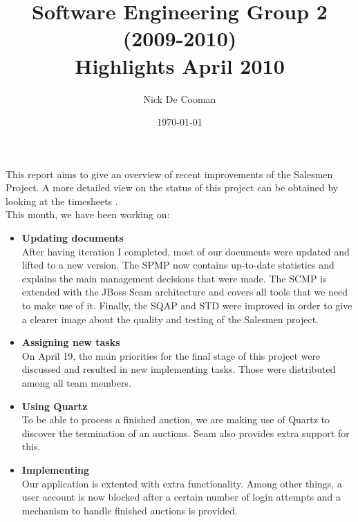\documentclass{article}
\begin{document}
	\title{Software Engineering Group 2 (2009-2010) \\ Highlights April 2010}
	\author{Nick De Cooman}
	\date{\today}

\maketitle

This report aims to give an overview of recent improvements of the Salesmen Project. A more detailed view on the status of this project can be obtained by looking at the timesheets \cite{timesheets}. \\

This month, we have been working on:

\begin{itemize}
	
	\item \textbf{Updating documents} \\
	After having iteration I completed, most of our documents were updated and lifted to a new version. The SPMP \cite{spmp} now contains up-to-date statistics and explains the main management decisions that were made. The SCMP \cite{scmp} is extended with the JBoss Seam architecture and covers all tools that we need to make use of it. Finally, the SQAP \cite{sqap} and STD \cite{std} were improved in order to give a clearer image about the quality and testing of the Salesmen project.
	
	\item \textbf{Assigning new tasks} \\
	On April 19, the main priorities for the final stage of this project were discussed and resulted in new implementing tasks. Those were distributed among all team members. 
	
	\item \textbf{Using Quartz} \\
	To be able to process a finished auction, we are making use of Quartz to discover the termination of an auctions. Seam also provides extra support for this.
	
	\item \textbf{Implementing} \\
	Our application is extented with extra functionality. Among other things, a user account is now blocked after a certain number of login attempts and a mechanism to handle finished auctions is provided.

\end{itemize}
\end{document}
